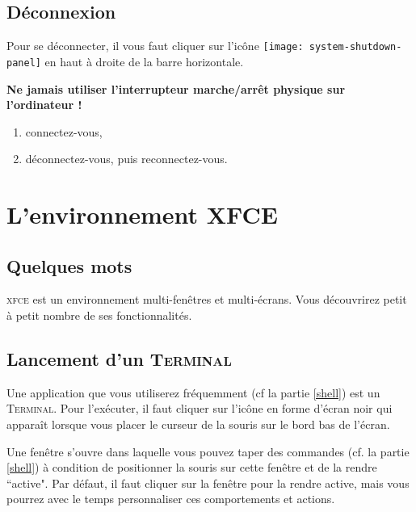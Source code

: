 \documentclass[a4paper,11pt]{article}
\newcommand{\term}{\textsc{Terminal}\xspace}
\newcommand{\gnome}{\textsc{xfce}\xspace}
\begin{document}
\subsection{Déconnexion}

Pour se déconnecter, il vous faut cliquer sur l'icône 
\texttt{[image: system-shutdown-panel]}
en haut à droite de la barre horizontale.

\begin{danger}
  \textbf{Ne jamais utiliser l'interrupteur marche/arrêt physique sur
  l'ordinateur !}
\end{danger}

\begin{maw}
\begin{enumerate}
  \item connectez-vous,
  \item déconnectez-vous, puis reconnectez-vous.
\end{enumerate}
\end{maw}

\section{L'environnement XFCE}

\subsection{Quelques mots}

\gnome est un environnement multi-fenêtres et multi-écrans. Vous découvrirez
petit à petit nombre de ses fonctionnalités.

\subsection{Lancement d'un \term}

Une application que vous utiliserez fréquemment (cf la partie \ref{shell}) est
un \term. Pour l'exécuter, il faut cliquer sur l'icône en forme
d'écran noir qui apparaît lorsque vous placer le curseur de la souris sur le
bord bas de l'écran. 


Une fenêtre s'ouvre dans laquelle vous pouvez taper des commandes (cf. la
partie \ref{shell}) à condition de positionner la souris sur cette fenêtre
et de la rendre ``active". Par défaut, il faut cliquer sur la fenêtre pour la
rendre active, mais vous pourrez avec le temps personnaliser ces comportements
et actions.
\end{document}
